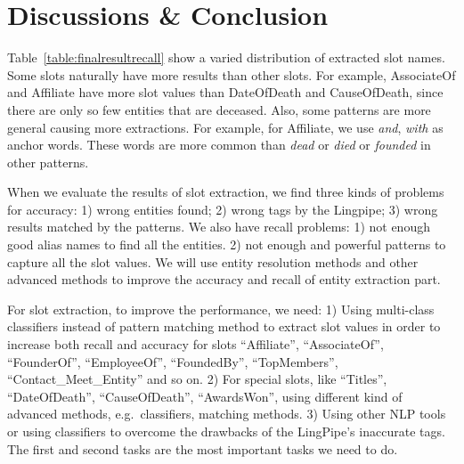 

\section{Discussions \& Conclusion}


Table~\ref{table:finalresultrecall} show a varied distribution of extracted slot names. Some slots naturally have more results than other slots. For example, AssociateOf and Affiliate have more slot values than DateOfDeath and CauseOfDeath, since there are only so few entities that are deceased. Also, some patterns are more general causing more extractions. For example, for Affiliate, we use \textit{and}, \textit{with} as anchor words. These words are more common than \textit{dead} or \textit{died} or \textit{founded} in other patterns. 







When we evaluate the results of slot extraction, we find three kinds of problems for accuracy: 1) wrong entities found; 2) wrong tags by the Lingpipe; 3) wrong results matched by the patterns.  We also have 
recall problems: 1) not enough good alias names to find all the entities. 2) not enough and powerful patterns to capture all the slot values. We will use entity resolution methods and other advanced methods to improve 
the accuracy and recall of entity extraction part. 

For slot extraction, to improve the performance, we need: 1) Using multi-class classifiers instead of pattern matching method to extract slot values in order to increase both recall and accuracy for slots ``Affiliate'', ``AssociateOf'', ``FounderOf'', ``EmployeeOf'', ``FoundedBy'', ``TopMembers'', ``Contact\_Meet\_Entity'' and so on. 2) For special slots, like ``Titles'', ``DateOfDeath'', ``CauseOfDeath'', ``AwardsWon'', using different kind of advanced methods, e.g.\ classifiers, matching methods. 3) Using other NLP tools or using classifiers to overcome the drawbacks of the LingPipe’s inaccurate tags. The first and second tasks are the most important tasks we need to do.

